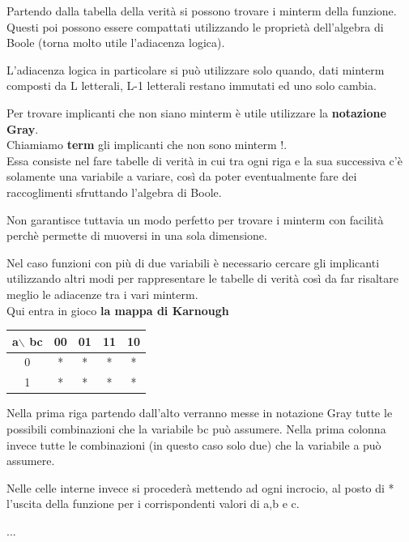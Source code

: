 \documentclass[a4paper]{book}
\begin{document}
Partendo dalla tabella della verità si possono trovare i minterm della funzione.\\Questi poi possono essere compattati utilizzando le proprietà dell'algebra di Boole (torna molto utile l'adiacenza logica).

L'adiacenza logica in particolare si può utilizzare solo quando, dati minterm composti da L letterali, L-1 letterali restano immutati ed uno solo cambia.

Per trovare implicanti che non siano minterm è utile utilizzare la \textbf{notazione Gray}.\\
Chiamiamo \textbf{term} gli implicanti che non sono minterm !.\\
Essa consiste nel fare tabelle di verità in cui tra ogni riga e la sua successiva c'è solamente una variabile a variare, così da poter eventualmente fare dei raccoglimenti sfruttando l'algebra di Boole.


Non garantisce tuttavia un modo perfetto per trovare i minterm con facilità perchè permette di muoversi in una sola dimensione.

\vspace{\baselineskip}

Nel caso funzioni con più di due variabili è necessario cercare gli implicanti utilizzando altri modi per rappresentare le tabelle di verità così da far risaltare meglio le adiacenze tra i vari minterm.\\
\vspace{\baselineskip}
Qui entra in gioco \textbf{la mappa di Karnough}
\vspace{\baselineskip}
\begin{tabular}{|c|c|c|c|c|}
\hline
a$\backslash$ bc & 00 & 01 & 11 & 10 \\
\hline
0              & *  & *  & *  & *  \\
\hline
1              & *  & *  & *  & *  \\
\hline
\end{tabular}
\vspace{\baselineskip}
Nella prima riga partendo dall'alto verranno messe in notazione Gray tutte le possibili combinazioni che la variabile bc può assumere.
Nella prima colonna invece tutte le combinazioni (in questo caso solo due) che la variabile a può assumere.

Nelle celle interne invece si procederà mettendo ad ogni incrocio, al posto di * l'uscita della funzione per i corrispondenti valori di a,b e c.


...
\end{document}
